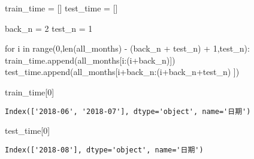 \documentclass[
  letterpaper,
  DIV=11,
  numbers=noendperiod]{scrreprt}
\newenvironment{Shaded}{\begin{snugshade}}{\end{snugshade}}
\newcommand{\BuiltInTok}[1]{\textcolor[rgb]{0.00,0.23,0.31}{#1}}
\newcommand{\ControlFlowTok}[1]{\textcolor[rgb]{0.00,0.23,0.31}{#1}}
\newcommand{\DecValTok}[1]{\textcolor[rgb]{0.68,0.00,0.00}{#1}}
\newcommand{\KeywordTok}[1]{\textcolor[rgb]{0.00,0.23,0.31}{#1}}
\newcommand{\NormalTok}[1]{\textcolor[rgb]{0.00,0.23,0.31}{#1}}
\newcommand{\OperatorTok}[1]{\textcolor[rgb]{0.37,0.37,0.37}{#1}}
\begin{document}
\begin{Shaded}
\begin{Highlighting}[]
\NormalTok{train\_time }\OperatorTok{=}\NormalTok{ []}
\NormalTok{test\_time }\OperatorTok{=}\NormalTok{ []}

\NormalTok{back\_n }\OperatorTok{=} \DecValTok{2}
\NormalTok{test\_n }\OperatorTok{=} \DecValTok{1}

\ControlFlowTok{for}\NormalTok{ i }\KeywordTok{in} \BuiltInTok{range}\NormalTok{(}\DecValTok{0}\NormalTok{,}\BuiltInTok{len}\NormalTok{(all\_months) }\OperatorTok{{-}}\NormalTok{ (back\_n }\OperatorTok{+}\NormalTok{ test\_n) }\OperatorTok{+} \DecValTok{1}\NormalTok{,test\_n):}
\NormalTok{    train\_time.append(all\_months[i:(i}\OperatorTok{+}\NormalTok{back\_n)])}
\NormalTok{    test\_time.append(all\_months[i}\OperatorTok{+}\NormalTok{back\_n:(i}\OperatorTok{+}\NormalTok{back\_n}\OperatorTok{+}\NormalTok{test\_n) ])}

\NormalTok{train\_time[}\DecValTok{0}\NormalTok{]}
\end{Highlighting}
\end{Shaded}

\begin{verbatim}
Index(['2018-06', '2018-07'], dtype='object', name='日期')
\end{verbatim}

\begin{Shaded}
\begin{Highlighting}[]
\NormalTok{test\_time[}\DecValTok{0}\NormalTok{]}
\end{Highlighting}
\end{Shaded}

\begin{verbatim}
Index(['2018-08'], dtype='object', name='日期')
\end{verbatim}
\end{document}
